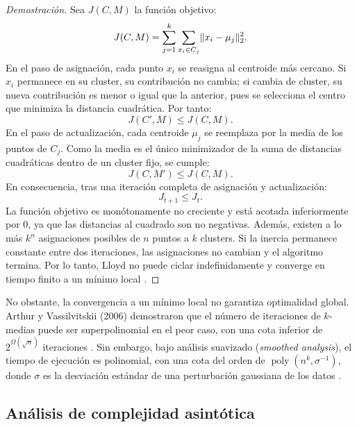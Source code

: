 \documentclass[11pt,letterpaper]{article}
\numberwithin{equation}{section}
\DeclarePairedDelimiter{\norm}{\lVert}{\rVert}
\DeclareMathOperator{\poly}{poly}
\theoremstyle{plain}
\begin{document}
\begin{proof}[Demostración]
Sea $J(C,M)$ la función objetivo:
\begin{equation}
J(C,M) = \sum_{j=1}^{k} \sum_{x_i \in C_j} \norm{x_i - \mu_j}_2^2.
\end{equation}
En el paso de asignación, cada punto $x_i$ se reasigna al centroide más cercano. Si $x_i$ permanece en su cluster, su contribución no cambia; si cambia de cluster, su nueva contribución es menor o igual que la anterior, pues se selecciona el centro que minimiza la distancia cuadrática. Por tanto:
\begin{equation}
J(C', M) \le J(C, M).
\end{equation}
En el paso de actualización, cada centroide $\mu_j$ se reemplaza por la media de los puntos de $C_j$. Como la media es el único minimizador de la suma de distancias cuadráticas dentro de un cluster fijo, se cumple:
\begin{equation}
J(C, M') \le J(C, M).
\end{equation}
En consecuencia, tras una iteración completa de asignación y actualización:
\begin{equation}
J_{t+1} \le J_t.
\end{equation}
La función objetivo es monótonamente no creciente y está acotada inferiormente por $0$, ya que las distancias al cuadrado son no negativas. Además, existen a lo más $k^n$ asignaciones posibles de $n$ puntos a $k$ clusters. Si la inercia permanece constante entre dos iteraciones, las asignaciones no cambian y el algoritmo termina. Por lo tanto, Lloyd no puede ciclar indefinidamente y converge en tiempo finito a un mínimo local \citep{lloyd1982,cormen2022}.
\end{proof}

No obstante, la convergencia a un mínimo local no garantiza optimalidad global. Arthur y Vassilvitskii (2006) demostraron que el número de iteraciones de $k$-medias puede ser superpolinomial en el peor caso, con una cota inferior de $2^{\Omega(\sqrt{n})}$ iteraciones \citep{arthur2006}. Sin embargo, bajo análisis suavizado (\textit{smoothed analysis}), el tiempo de ejecución es polinomial, con una cota del orden de $\poly(n^k, \sigma^{-1})$, donde $\sigma$ es la desviación estándar de una perturbación gaussiana de los datos \citep{arthur2006,arthur2008}.

\subsection{Análisis de complejidad asintótica}
\end{document}
